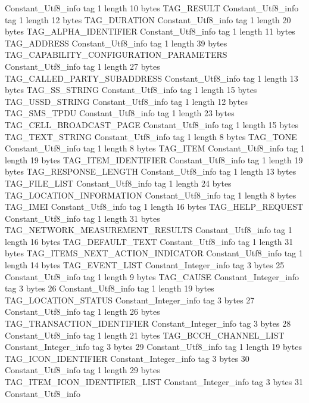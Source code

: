 {{{		}
		Constant_Utf8_info {
			tag	1
			length	10
			bytes	TAG_RESULT
		}
		Constant_Utf8_info {
			tag	1
			length	12
			bytes	TAG_DURATION
		}
		Constant_Utf8_info {
			tag	1
			length	20
			bytes	TAG_ALPHA_IDENTIFIER
		}
		Constant_Utf8_info {
			tag	1
			length	11
			bytes	TAG_ADDRESS
		}
		Constant_Utf8_info {
			tag	1
			length	39
			bytes	TAG_CAPABILITY_CONFIGURATION_PARAMETERS
		}
		Constant_Utf8_info {
			tag	1
			length	27
			bytes	TAG_CALLED_PARTY_SUBADDRESS
		}
		Constant_Utf8_info {
			tag	1
			length	13
			bytes	TAG_SS_STRING
		}
		Constant_Utf8_info {
			tag	1
			length	15
			bytes	TAG_USSD_STRING
		}
		Constant_Utf8_info {
			tag	1
			length	12
			bytes	TAG_SMS_TPDU
		}
		Constant_Utf8_info {
			tag	1
			length	23
			bytes	TAG_CELL_BROADCAST_PAGE
		}
		Constant_Utf8_info {
			tag	1
			length	15
			bytes	TAG_TEXT_STRING
		}
		Constant_Utf8_info {
			tag	1
			length	8
			bytes	TAG_TONE
		}
		Constant_Utf8_info {
			tag	1
			length	8
			bytes	TAG_ITEM
		}
		Constant_Utf8_info {
			tag	1
			length	19
			bytes	TAG_ITEM_IDENTIFIER
		}
		Constant_Utf8_info {
			tag	1
			length	19
			bytes	TAG_RESPONSE_LENGTH
		}
		Constant_Utf8_info {
			tag	1
			length	13
			bytes	TAG_FILE_LIST
		}
		Constant_Utf8_info {
			tag	1
			length	24
			bytes	TAG_LOCATION_INFORMATION
		}
		Constant_Utf8_info {
			tag	1
			length	8
			bytes	TAG_IMEI
		}
		Constant_Utf8_info {
			tag	1
			length	16
			bytes	TAG_HELP_REQUEST
		}
		Constant_Utf8_info {
			tag	1
			length	31
			bytes	TAG_NETWORK_MEASUREMENT_RESULTS
		}
		Constant_Utf8_info {
			tag	1
			length	16
			bytes	TAG_DEFAULT_TEXT
		}
		Constant_Utf8_info {
			tag	1
			length	31
			bytes	TAG_ITEMS_NEXT_ACTION_INDICATOR
		}
		Constant_Utf8_info {
			tag	1
			length	14
			bytes	TAG_EVENT_LIST
		}
		Constant_Integer_info {
			tag	3
			bytes	25
		}
		Constant_Utf8_info {
			tag	1
			length	9
			bytes	TAG_CAUSE
		}
		Constant_Integer_info {
			tag	3
			bytes	26
		}
		Constant_Utf8_info {
			tag	1
			length	19
			bytes	TAG_LOCATION_STATUS
		}
		Constant_Integer_info {
			tag	3
			bytes	27
		}
		Constant_Utf8_info {
			tag	1
			length	26
			bytes	TAG_TRANSACTION_IDENTIFIER
		}
		Constant_Integer_info {
			tag	3
			bytes	28
		}
		Constant_Utf8_info {
			tag	1
			length	21
			bytes	TAG_BCCH_CHANNEL_LIST
		}
		Constant_Integer_info {
			tag	3
			bytes	29
		}
		Constant_Utf8_info {
			tag	1
			length	19
			bytes	TAG_ICON_IDENTIFIER
		}
		Constant_Integer_info {
			tag	3
			bytes	30
		}
		Constant_Utf8_info {
			tag	1
			length	29
			bytes	TAG_ITEM_ICON_IDENTIFIER_LIST
		}
		Constant_Integer_info {
			tag	3
			bytes	31
		}
		Constant_Utf8_info {
}}}
